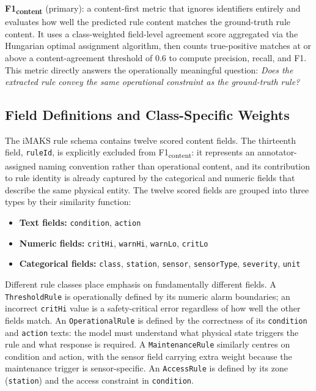 ﻿\documentclass[11pt]{article}
\begin{document}
\textbf{F1\textsubscript{content}} (primary): a content-first metric that
ignores identifiers entirely and evaluates how well the predicted rule content
matches the ground-truth rule content.
It uses a class-weighted field-level agreement score aggregated via the
Hungarian optimal assignment algorithm, then counts true-positive matches at
or above a content-agreement threshold of $0.6$ to compute precision, recall,
and F1.
This metric directly answers the operationally meaningful question:
\emph{Does the extracted rule convey the same operational constraint as the
ground-truth rule?}

\subsection{Field Definitions and Class-Specific Weights}
\label{sec:field_weights}

The iMAKS rule schema contains twelve scored content fields.
The thirteenth field, \texttt{ruleId}, is explicitly excluded from
F1\textsubscript{content}: it represents an annotator-assigned naming convention
rather than operational content, and its contribution to rule identity is already
captured by the categorical and numeric fields that describe the same physical
entity.
The twelve scored fields are grouped into three types by their similarity
function:
\begin{itemize}
\item \textbf{Text fields:} \texttt{condition}, \texttt{action}
\item \textbf{Numeric fields:} \texttt{critHi}, \texttt{warnHi}, \texttt{warnLo},
      \texttt{critLo}
\item \textbf{Categorical fields:} \texttt{class}, \texttt{station},
      \texttt{sensor}, \texttt{sensorType}, \texttt{severity}, \texttt{unit}
\end{itemize}

Different rule classes place emphasis on fundamentally different fields.
A \texttt{ThresholdRule} is operationally defined by its numeric alarm boundaries;
an incorrect \texttt{critHi} value is a safety-critical error regardless of how
well the other fields match.
An \texttt{OperationalRule} is defined by the correctness of its
\texttt{condition} and \texttt{action} texts: the model must understand what
physical state triggers the rule and what response is required.
A \texttt{MaintenanceRule} similarly centres on condition and action, with the
sensor field carrying extra weight because the maintenance trigger is
sensor-specific.
An \texttt{AccessRule} is defined by its zone (\texttt{station}) and the
access constraint in \texttt{condition}.
\end{document}
